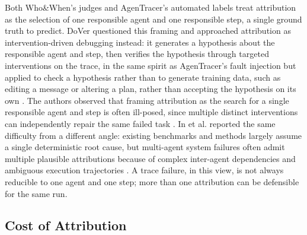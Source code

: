 Both Who\&When's judges and AgenTracer's automated labels treat attribution as the selection of one responsible agent and one responsible step, a single ground truth to predict. DoVer questioned this framing and approached attribution as intervention-driven debugging instead: it generates a hypothesis about the responsible agent and step, then verifies the hypothesis through targeted interventions on the trace, in the same spirit as AgenTracer's fault injection but applied to check a hypothesis rather than to generate training data, such as editing a message or altering a plan, rather than accepting the hypothesis on its own \cite{maDoVerInterventionDrivenAuto2026}. The authors observed that framing attribution as the search for a single responsible agent and step is often ill-posed, since multiple distinct interventions can independently repair the same failed task \cite{maDoVerInterventionDrivenAuto2026}. In et al. reported the same difficulty from a different angle: existing benchmarks and methods largely assume a single deterministic root cause, but multi-agent system failures often admit multiple plausible attributions because of complex inter-agent dependencies and ambiguous execution trajectories \cite{inRethinkingFailureAttribution2026}. A trace failure, in this view, is not always reducible to one agent and one step; more than one attribution can be defensible for the same run.

\subsection{Cost of Attribution}
\label{sec:cost-of-attribution}

